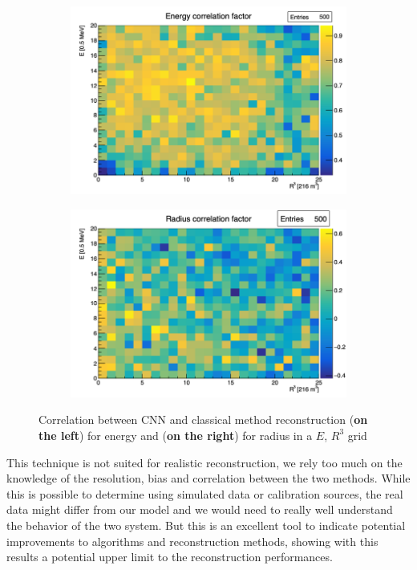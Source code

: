\documentclass[../main.tex]{subfiles}
\begin{document}
\begin{figure}
  \centering
  \begin{subfigure}[t]{0.48\linewidth}
    \includegraphics[width=\linewidth]{images/jcnn/vic_cnn/vic_cnn_e_corr.png}
  \end{subfigure}
  \hfill
  \begin{subfigure}[t]{0.48\linewidth}
    \includegraphics[width=\linewidth]{images/jcnn/vic_cnn/vic_cnn_r_corr.png}
  \end{subfigure}
  \caption{Correlation between CNN and classical method reconstruction (\textbf{on the left}) for energy and (\textbf{on the right}) for radius in a $E$, $R^3$ grid}
  \label{fig:jcnn:vic_cnn:corr}
\end{figure}

This technique is not suited for realistic reconstruction, we rely too much on the knowledge of the resolution, bias and correlation between the two methods. While this is possible to determine using simulated data or calibration sources, the real data might differ from our model and we would need to really well understand the behavior of the two system. But this is an excellent tool to indicate potential improvements to algorithms and reconstruction methods, showing with this results a potential upper limit to the reconstruction performances.
\end{document}
